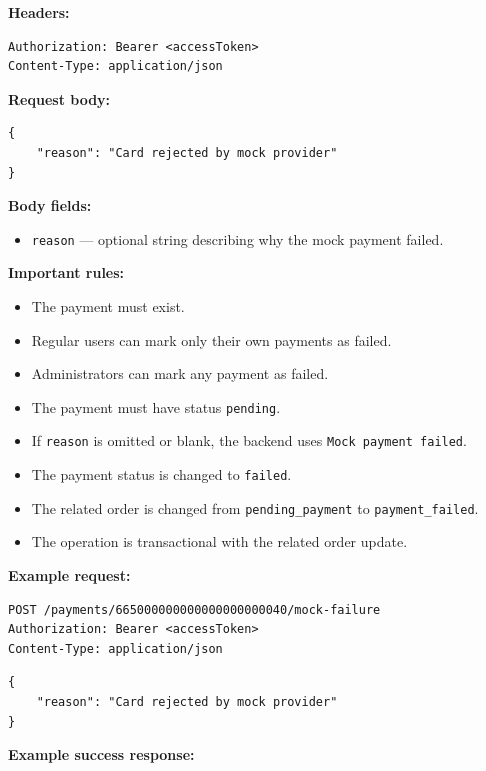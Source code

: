 \textbf{Headers:}

\begin{verbatim}
Authorization: Bearer <accessToken>
Content-Type: application/json
\end{verbatim}

\textbf{Request body:}

\begin{verbatim}
{
    "reason": "Card rejected by mock provider"
}
\end{verbatim}

\textbf{Body fields:}

\begin{itemize}
    \item \texttt{reason} --- optional string describing why the mock payment failed.
\end{itemize}

\textbf{Important rules:}

\begin{itemize}
    \item The payment must exist.
    \item Regular users can mark only their own payments as failed.
    \item Administrators can mark any payment as failed.
    \item The payment must have status \texttt{pending}.
    \item If \texttt{reason} is omitted or blank, the backend uses \texttt{Mock payment failed}.
    \item The payment status is changed to \texttt{failed}.
    \item The related order is changed from \texttt{pending\_payment} to \texttt{payment\_failed}.
    \item The operation is transactional with the related order update.
\end{itemize}

\textbf{Example request:}

\begin{verbatim}
POST /payments/665000000000000000000040/mock-failure
Authorization: Bearer <accessToken>
Content-Type: application/json
\end{verbatim}

\begin{verbatim}
{
    "reason": "Card rejected by mock provider"
}
\end{verbatim}

\textbf{Example success response:}

